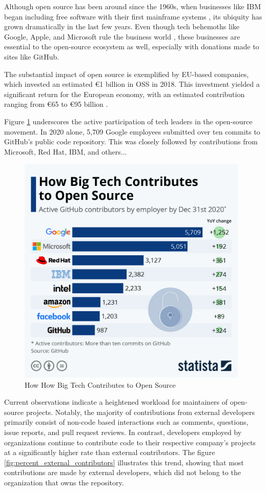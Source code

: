 Although open source has been around since the 1960s, when businesses like IBM began including free software with their first mainframe systems \cite{moreno2006open}, its ubiquity has grown dramatically in the last few years.  Even though tech behemoths like Google, Apple, and Microsoft rule the business world \cite{jacobides2020regulating}, these businesses are essential to the open-source ecosystem as well, especially with donations made to sites like GitHub.

The substantial impact of open source is exemplified by EU-based companies, which invested an estimated €1 billion in OSS in 2018. This investment yielded a significant return for the European economy, with an estimated contribution ranging from €65 to €95 billion \cite{blind2021impact}.

Figure \ref{fig:bigtechcontributes} underscores the active participation of tech leaders in the open-source movement.  In 2020 alone, 5,709 Google employees submitted over ten commits to GitHub's public code repository. This was closely followed by contributions from Microsoft, Red Hat, IBM, and others...

\begin{figure}[ht]
    \includegraphics[width=11cm]{figs/bigtechcontributes.jpeg}
    \centering
    \caption{How How Big Tech Contributes to Open Source \cite{statista2021bigtechopensource}}
    \label{fig:bigtechcontributes}
\end{figure}


Current observations indicate a heightened workload for maintainers of open-source projects. Notably, the majority of contributions from external developers primarily consist of non-code based interactions such as comments, questions, issue reports, and pull request reviews. In contrast, developers employed by organizations continue to contribute code to their respective company's projects at a significantly higher rate than external contributors. The figure \ref{fig:percent_external_contributors} illustrates this trend, showing that most contributions are made by external developers, which did not belong to the organization that owns the repository.

